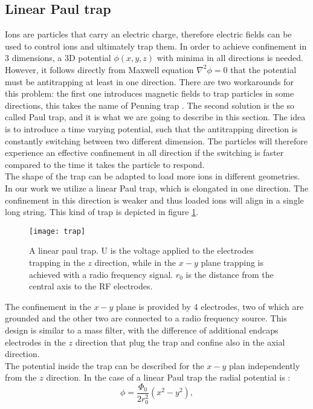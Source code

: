 \subsection{Linear Paul trap}
Ions are particles that carry an electric charge, therefore electric fields can be used to control ions and ultimately trap them. In order to achieve confinement in 3 dimensions, a 3D potential $\phi(x,y,z)$ with minima in all directions is needed. However, it follows directly from Maxwell equation $\nabla^2 \phi = 0$ that the potential must be antitrapping at least in one direction. There are two workarounds for this problem: the first one introduces magnetic fields to trap particles in some directions, this takes the name of Penning trap \cite{RevModPhys.58.233}. The second solution is the so called Paul trap, and it is what we are going to describe in this section. The idea is to introduce a time varying potential, such that the antitrapping direction is constantly switching between two different dimension. The particles will therefore experience an effective confinement in all direction if the switching is faster compared to the time it takes the particle to respond.\\
The shape of the trap can be adapted to load more ions in different geometries. In our work we utilize a linear Paul trap, which is elongated in one direction. The confinement in this direction is weaker and thus loaded ions will align in a single long string. This kind of trap is depicted in figure \ref{trap}.
\begin{figure}[H]
\centering
\texttt{[image: trap]}
\caption{A linear paul trap. U is the voltage applied to the electrodes trapping in the $z$ direction, while in the $x-y$ plane trapping is achieved with a radio frequency signal. $r_0$ is the distance from the central axis to the RF electrodes.}
\label{trap}
\end{figure}
The confinement in the $x-y$ plane is provided by 4 electrodes, two of which are grounded and the other two are connected to a radio frequency source. This design is similar to a mass filter, with the difference of additional endcaps electrodes in the $z$ direction that plug the trap and confine also in the axial direction.\\
The potential inside the trap can be described for the $x-y$ plan independently from the $z$ direction. In the case of a linear Paul trap the radial potential is \cite{traptheory}:
\begin{equation}
\phi  = \frac{\Phi_0}{2r_0^2}\left(x^2 - y^2\right),
\end{equation}
